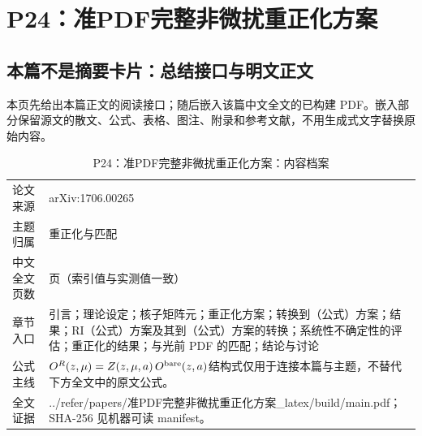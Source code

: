 \documentclass[UTF8,11pt,oneside]{ctexbook}
\begin{document}
\chapter{P24：准PDF完整非微扰重正化方案}
\section*{本篇不是摘要卡片：总结接口与明文正文}
本页先给出本篇正文的阅读接口；随后嵌入该篇中文全文的已构建 PDF。嵌入部分保留源文的散文、公式、表格、图注、附录和参考文献，不用生成式文字替换原始内容。
\begin{table}[htbp]
  \centering
  \caption{P24：准PDF完整非微扰重正化方案：内容档案}
  \small
  \begin{tabularx}{0.96\textwidth}{@{}p{3.3cm}>{\raggedright\arraybackslash}X@{}}
    \toprule
    论文来源 & arXiv:1706.00265 \\
    主题归属 & 重正化与匹配 \\
    中文全文页数 & 19 页（索引值与实测值一致） \\
    章节入口 & 引言；理论设定；核子矩阵元；重正化方案；转换到（公式）方案；结果；RI（公式）方案及其到（公式）方案的转换；系统性不确定性的评估；重正化的结果；与光前 PDF 的匹配；结论与讨论 \\
    公式主线 & $O^{R}(z,\mu)=Z(z,\mu,a)\,O^{\rm bare}(z,a)$\newline\scriptsize 结构式仅用于连接本篇与主题，不替代下方全文中的原文公式。 \\
    全文证据 & ../\allowbreak{}refer/\allowbreak{}papers/\allowbreak{}准PDF完整非微扰重正化方案\_\allowbreak{}latex/\allowbreak{}build/\allowbreak{}main.pdf；SHA-256 见机器可读 manifest。 \\
    \bottomrule
  \end{tabularx}
\end{table}
\end{document}
